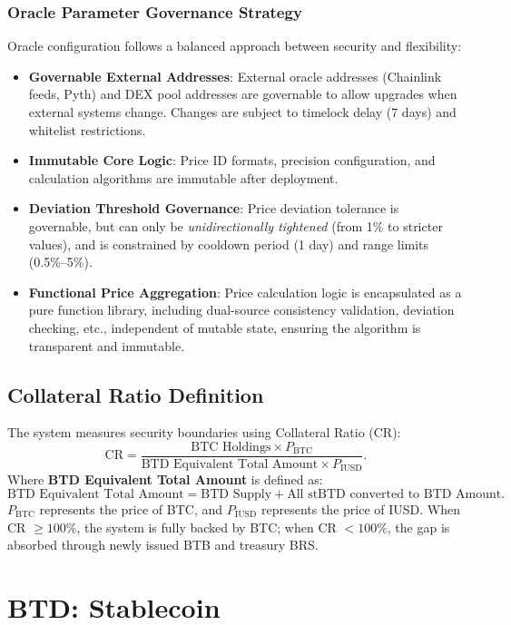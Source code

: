 \documentclass{article}
\begin{document}
\subsubsection{Oracle Parameter Governance Strategy}
Oracle configuration follows a balanced approach between security and flexibility:
\begin{itemize}
  \item \textbf{Governable External Addresses}: External oracle addresses (Chainlink feeds, Pyth) and DEX pool addresses are governable to allow upgrades when external systems change. Changes are subject to timelock delay (7 days) and whitelist restrictions.
  \item \textbf{Immutable Core Logic}: Price ID formats, precision configuration, and calculation algorithms are immutable after deployment.
  \item \textbf{Deviation Threshold Governance}: Price deviation tolerance is governable, but can only be \textit{unidirectionally tightened} (from 1\% to stricter values), and is constrained by cooldown period (1 day) and range limits (0.5\%--5\%).
  \item \textbf{Functional Price Aggregation}: Price calculation logic is encapsulated as a pure function library, including dual-source consistency validation, deviation checking, etc., independent of mutable state, ensuring the algorithm is transparent and immutable.
\end{itemize}

\subsection{Collateral Ratio Definition}
The system measures security boundaries using Collateral Ratio (CR):
\begin{equation}
\text{CR} = \frac{\text{BTC Holdings} \times P_{\text{BTC}}}{\text{BTD Equivalent Total Amount} \times P_{\text{IUSD}}}.
\end{equation}
Where \textbf{BTD Equivalent Total Amount} is defined as:
\begin{equation}
\text{BTD Equivalent Total Amount} = \text{BTD Supply} + \text{All stBTD converted to BTD Amount}.
\end{equation}
$P_{\text{BTC}}$ represents the price of BTC, and $P_{\text{IUSD}}$ represents the price of IUSD. When CR $\geq 100\%$, the system is fully backed by BTC; when CR $< 100\%$, the gap is absorbed through newly issued BTB and treasury BRS.

\section{BTD: Stablecoin}
\end{document}
